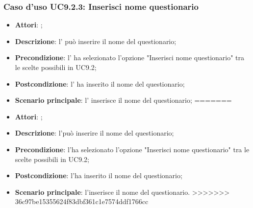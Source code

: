 		\subsubsection{Caso d'uso UC9.2.3: Inserisci nome questionario}
		\label{UC9.2.3}
		\begin{itemize}
<<<<<<< HEAD
			\item \textbf{Attori}: \uaupro{};
			\item \textbf{Descrizione}: l'\uaupro{} può inserire il nome del questionario; 
			\item \textbf{Precondizione}: l'\uaupro{} ha selezionato l'opzione "Inserisci nome questionario" tra le scelte possibili in UC9.2;
			\item \textbf{Postcondizione}: l'\uaupro{} ha inserito il nome del questionario; 
			\item \textbf{Scenario principale}: l'\uaupro{} inserisce il nome del questionario;
=======
			\item \textbf{Attori}: \uaupro;
			\item \textbf{Descrizione}: l'\uaupro può inserire il nome del questionario; 
			\item \textbf{Precondizione}: l'\uaupro ha selezionato l'opzione "Inserisci nome questionario" tra le scelte possibili in UC9.2;
			\item \textbf{Postcondizione}: l'\uaupro ha inserito il nome del questionario; 
			\item \textbf{Scenario principale}: l'\uaupro inserisce il nome del questionario.
>>>>>>> 36c97be15355624f83dbf361c1e7574ddf1766cc
		\end{itemize}
				
